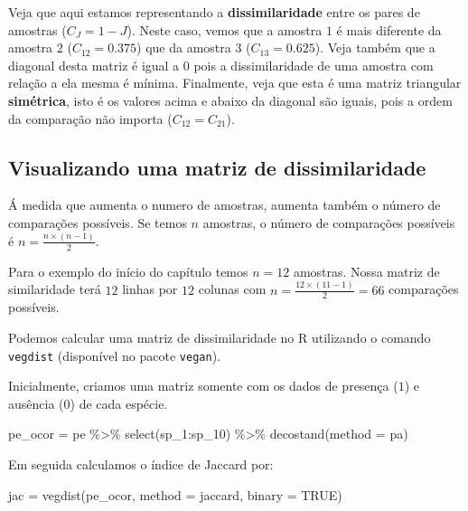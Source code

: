 \documentclass[
]{book}
\newenvironment{Shaded}{\begin{snugshade}}{\end{snugshade}}
\newcommand{\AttributeTok}[1]{\textcolor[rgb]{0.77,0.63,0.00}{#1}}
\newcommand{\ConstantTok}[1]{\textcolor[rgb]{0.00,0.00,0.00}{#1}}
\newcommand{\FunctionTok}[1]{\textcolor[rgb]{0.00,0.00,0.00}{#1}}
\newcommand{\NormalTok}[1]{#1}
\newcommand{\OtherTok}[1]{\textcolor[rgb]{0.56,0.35,0.01}{#1}}
\newcommand{\SpecialCharTok}[1]{\textcolor[rgb]{0.00,0.00,0.00}{#1}}
\newcommand{\StringTok}[1]{\textcolor[rgb]{0.31,0.60,0.02}{#1}}
\begin{document}
Veja que aqui estamos representando a \textbf{dissimilaridade} entre os pares de amostras (\(C_{J} = 1 - J\)). Neste caso, vemos que a amostra \(1\) é mais diferente da amostra \(2\) (\(C_{12} = 0.375\)) que da amostra \(3\) (\(C_{13} = 0.625\)).
Veja também que a diagonal desta matriz é igual a \(0\) pois a dissimilaridade de uma amostra com relação a ela mesma é mínima. Finalmente, veja que esta é uma matriz triangular \textbf{simétrica}, isto é os valores acima e abaixo da diagonal são iguais, pois a ordem da comparação não importa (\(C_{12} = C_{21}\)).

\hypertarget{visualizando-uma-matriz-de-dissimilaridade}{%
\subsection{Visualizando uma matriz de dissimilaridade}\label{visualizando-uma-matriz-de-dissimilaridade}}

Á medida que aumenta o numero de amostras, aumenta também o número de comparações possíveis. Se temos \(n\) amostras, o número de comparações possíveis é \(n = \frac{n \times (n - 1)}{2}\).

Para o exemplo do início do capítulo temos \(n = 12\) amostras. Nossa matriz de similaridade terá \(12\) linhas por \(12\) colunas com \(n = \frac{12 \times (11 - 1)}{2} = 66\) comparações possíveis.

Podemos calcular uma matriz de dissimilaridade no R utilizando o comando \texttt{vegdist} (disponível no pacote \texttt{vegan}).

Inicialmente, criamos uma matriz somente com os dados de presença (\(1\)) e ausência (\(0\)) de cada espécie.

\begin{Shaded}
\begin{Highlighting}[]
\NormalTok{pe\_ocor }\OtherTok{=}\NormalTok{ pe }\SpecialCharTok{\%\textgreater{}\%} 
  \FunctionTok{select}\NormalTok{(sp\_1}\SpecialCharTok{:}\NormalTok{sp\_10) }\SpecialCharTok{\%\textgreater{}\%} 
  \FunctionTok{decostand}\NormalTok{(}\AttributeTok{method =} \StringTok{\textquotesingle{}pa\textquotesingle{}}\NormalTok{)}
\end{Highlighting}
\end{Shaded}

Em seguida calculamos o índice de Jaccard por:

\begin{Shaded}
\begin{Highlighting}[]
\NormalTok{jac }\OtherTok{=} \FunctionTok{vegdist}\NormalTok{(pe\_ocor, }\AttributeTok{method =} \StringTok{\textquotesingle{}jaccard\textquotesingle{}}\NormalTok{, }\AttributeTok{binary =} \ConstantTok{TRUE}\NormalTok{)}
\end{Highlighting}
\end{Shaded}
\end{document}
